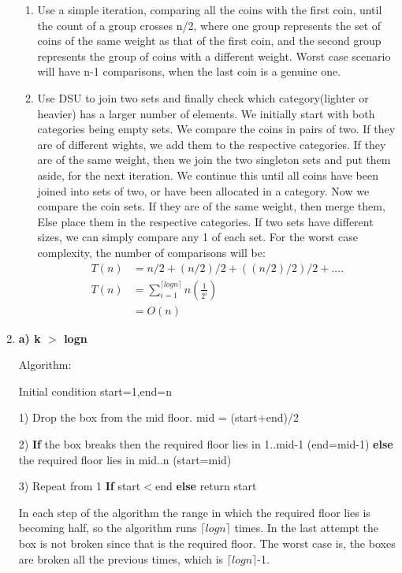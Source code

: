 \documentclass[12pt]{article}
\begin{document}
\begin{enumerate}
        \begin{enumerate}
            \item Use a simple iteration, comparing all the coins with the first coin, until the count of a group crosses n/2, where one group represents the set of coins of the same weight as that of the first coin, and the second group represents the group of coins with a different weight. Worst case scenario will have n-1 comparisons, when the last coin is a genuine one.
            \item Use DSU to join two sets and finally check which category(lighter or heavier) has a larger number of elements. We initially start with both categories being empty sets. We compare the coins in pairs of two. If they are of different wights, we add them to the respective categories. If they are of the same weight, then we join the two singleton sets and put them aside, for the next iteration. We continue this until all coins have been joined into sets of two, or have been allocated in a category. Now we compare the coin sets. If they are of the same weight, then merge them, Else place them in the respective categories. If two sets have different sizes, we can simply compare any 1 of each set. For the worst case complexity, the number of comparisons will be:
            \begin{align*}
                T(n) &= n/2 + (n/2)/2 + ((n/2)/2)/2 + ....\\
                T(n) &= \sum_{i=1}^{\lceil logn \rceil}n(\frac{1}{2^i}) \\
                &= O(n)
            \end{align*}
        \end{enumerate}
    \item
    \textbf{a) k $>$ logn}
    
    Algorithm:
    
    Initial condition start=1,end=n
    
    1) Drop the box from the mid floor. mid = (start+end)/2
    
    2) \textbf{If} the box breaks then the required floor lies in 1..mid-1 (end=mid-1) \textbf{else} the required floor lies in mid..n (start=mid)
    
    3) Repeat from 1 \textbf{If} start$<$end \textbf{else} return start
    
    In each step of the algorithm the range in which the required floor lies is becoming half, so the algorithm runs $\lceil logn \rceil$ times. In the last attempt the box is not broken since that is the required floor. The worst case is, the boxes are broken all the previous times, which is $\lceil logn \rceil$-1.
    

\end{enumerate}
\end{document}
